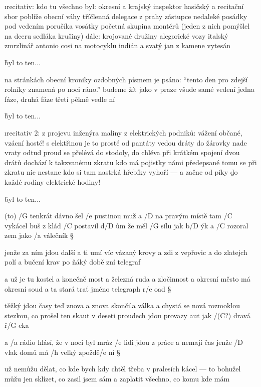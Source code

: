 {\i recitativ:} \s
kdo tu všechno byl:
okresní a krajský inspektor
hasičský a recitační sbor
poblíže obecní váhy
tříčlenná delegace z prahy
zástupce nedaleké posádky
pod vedením poručíka vosátky
početná skupina montérů
(jeden z nich pomýšlel
na dceru sedláka krušiny)
dále: krojované družiny
alegorické vozy
italský zmrzlinář antonio cosi
na motocyklu indián
a svatý jan z kamene vytesán \s

\r byl to ten...


\songgg{}

na stránkách obecní kroniky
ozdobných písmem je psáno:
``tento den pro zdejší rolníky
znamená po noci ráno.''
budeme žít jako v praze
všude samé vedení
jedna fáze, druhá fáze
třetí pěkně vedle ní \s

\r byl to ten...

{\i recitativ 2:} \s
z projevu inženýra maliny
z elektrických podniků:
vážení občané, vzácní hosté!
s elektřinou je to prosté
od pantáty vedou dráty
do žárovky nade vraty
odtud proud se přelévá
do stodoly, do chléva
při krátkém spojení dvou drátů
dochází k takzvanému zkratu
kdo má pojistky námi předepsané
tomu se při zkratu nic nestane
kdo si tam nastrká hřebíky
vyhoří --- a začne od píky
{\b do každé rodiny
elektrické hodiny!} \s

\r byl to ten...




(to) /G tenkrát dávno šel /e pustinou muž
a /D na pravým místě tam /C vykácel buš
z klád /C postavil d/D ům že měl /G sílu jak b/D ýk
a /C rozoral zem jako /a válečník \S

jenže za ním jdou další a ti umí víc
vázaný krovy a zdi z vepřovic
a do zlatejch polí a bučení krav
po ňáký době zní telegraf \s

a už je tu kostel a konečně most
a železná ruda a zločinnost
a okresní město má okresní soud
a ta stará trať jméno telegraph r/e oad \S

těžký jdou časy teď znova a znova
skončila válka a chystá se nová
rozmoklou stezkou, co prošel ten skaut
v deseti proudech jdou provazy aut
jak /(C?) dravá ř/G eka \s

a /a rádio hlásí, že v noci byl mráz
/e lidi jdou z práce a nemají čas
jenže /D vlak domů má /h velký zpoždě/e ní \S

už nemůžu dělat, co kde bych kdy chtěl
třeba v pralesích kácel --- to bohužel
můžu jen sklízet, co zasil jsem sám
a zaplatit všechno, co komu kde mám \s

